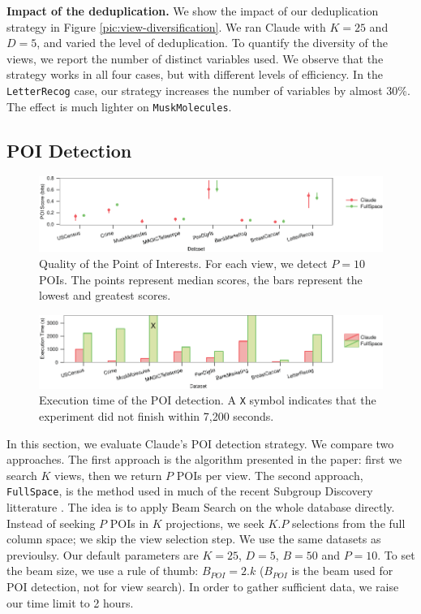 \textbf{Impact of the deduplication.} We show the impact of our deduplication
strategy in Figure \ref{pic:view-diversification}.  We ran Claude with $K=25$
and $D=5$, and varied the level of deduplication. To quantify the diversity of
the views, we report the number of distinct variables used. We observe that the
strategy works in all four cases, but with different levels of efficiency. In
the \texttt{LetterRecog} case, our strategy increases the number of variables
by almost 30\%. The effect is much lighter on \texttt{MuskMolecules}.

\subsection{POI Detection}
\label{sec:exp-poi}

\begin{figure}[t!]
\centering
\includegraphics[width=2\columnwidth]{plots/POI-score}
\caption{Quality of the Point of Interests. For each view, we detect $P=10$
POIs. The
    points represent median scores, the bars represent the lowest and greatest
    scores.}
\label{pic:POI-quali}
\end{figure}
\begin{figure}[t!]
\centering
\includegraphics[width=2\columnwidth]{plots/POI-timing}
\caption{Execution time of the POI detection. A \texttt{X} symbol
indicates that the experiment did not finish within 7,200 seconds.}
\label{pic:POI-time}
\end{figure}

In this section, we evaluate Claude's POI detection strategy. We compare two
approaches. The first approach is the algorithm presented in the paper: first
we search $K$ views, then we return $P$ POIs per view. The second approach,
\texttt{FullSpace}, is the method used in much of the recent Subgroup Discovery
litterature \cite{van2011non, duivesteijn2010subgroup}.  The idea is to apply
Beam Search on the whole database directly. Instead of seeking $P$ POIs in $K$
projections, we seek $K.P$ selections from the full column space; we skip the
view selection step. We use the same datasets as previoulsy. Our default
parameters are $K=25$, $D=5$, $B=50$ and $P=10$. To set the beam size, we use a rule of
thumb: $B_{POI} = 2.k$ ($B_{POI}$ is the beam used for POI detection,
not for view search). In order to gather sufficient data, we raise our time
limit to 2 hours. 

